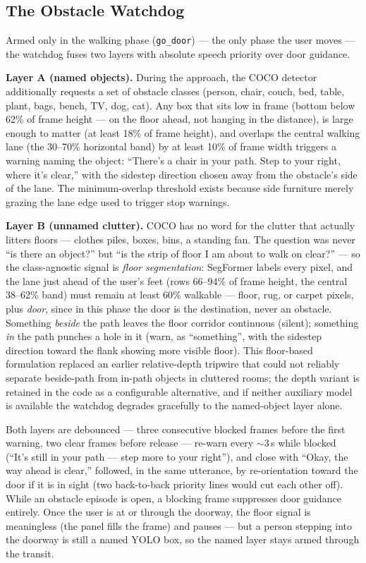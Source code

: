 \subsection{The Obstacle Watchdog}
\label{sec:obstacles}

Armed only in the walking phase (\texttt{go\_door}) --- the only phase the user
moves --- the watchdog fuses two layers with absolute speech priority over door
guidance.

\textbf{Layer A (named objects).} During the approach, the COCO detector
additionally requests a set of obstacle classes (person, chair, couch, bed, table,
plant, bags, bench, TV, dog, cat). Any box that sits low in frame (bottom below
62\% of frame height --- on the floor ahead, not hanging in the distance), is large
enough to matter (at least 18\% of frame height), and overlaps the central walking
lane (the 30--70\% horizontal band) by at least 10\% of frame width triggers a
warning naming the object: ``There's a chair in your path. Step to your right,
where it's clear,'' with the sidestep direction chosen away from the obstacle's
side of the lane. The minimum-overlap threshold exists because side furniture
merely grazing the lane edge used to trigger stop warnings.

\textbf{Layer B (unnamed clutter).} COCO has no word for the clutter that actually
litters floors --- clothes piles, boxes, bins, a standing fan. The question was
never ``is there an object?'' but ``is the strip of floor I am about to walk on
clear?'' --- so the class-agnostic signal is \emph{floor segmentation}: SegFormer
labels every pixel, and the lane just ahead of the user's feet (rows 66--94\% of
frame height, the central 38--62\% band) must remain at least 60\% walkable ---
floor, rug, or carpet pixels, plus \emph{door}, since in this phase the door is the
destination, never an obstacle. Something \emph{beside} the path leaves the floor
corridor continuous (silent); something \emph{in} the path punches a hole in it
(warn, as ``something'', with the sidestep direction toward the flank showing more
visible floor). This floor-based formulation replaced an earlier relative-depth
tripwire \cite{yang2024depthanything} that could not reliably separate beside-path
from in-path objects in cluttered rooms; the depth variant is retained in the code
as a configurable alternative, and if neither auxiliary model is available the
watchdog degrades gracefully to the named-object layer alone.

Both layers are debounced --- three consecutive blocked frames before the first
warning, two clear frames before release --- re-warn every ${\sim}3$\,s while
blocked (``It's still in your path --- step more to your right''), and close with
``Okay, the way ahead is clear,'' followed, in the same utterance, by
re-orientation toward the door if it is in sight (two back-to-back priority lines
would cut each other off). While an obstacle episode is open, a blocking frame
suppresses door guidance entirely. Once the user is at or through the doorway, the
floor signal is meaningless (the panel fills the frame) and pauses --- but a person
stepping into the doorway is still a named YOLO box, so the named layer stays armed
through the transit.

